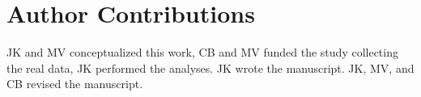 \documentclass[10pt,letterpaper]{article}
\begin{document}
\section*{Author Contributions}
JK and MV conceptualized this work, CB and MV funded the study collecting the real data,
JK performed the analyses. JK wrote the manuscript. JK, MV, and CB revised the manuscript.

\nolinenumbers


%
%
% 




\end{document}
